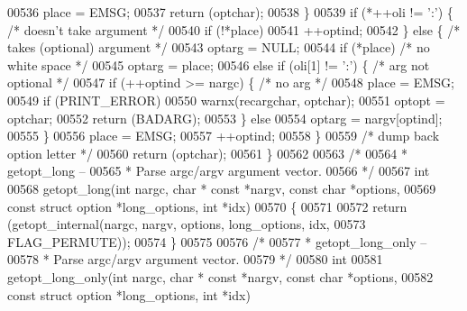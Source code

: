 \begin{DoxyCode}
{{{{{{{00536         place = EMSG;
00537         \textcolor{keywordflow}{return} (optchar);
00538     \}
00539     \textcolor{keywordflow}{if} (*++oli != \textcolor{charliteral}{':'}) \{            \textcolor{comment}{/* doesn't take argument */}
00540         \textcolor{keywordflow}{if} (!*place)
00541             ++optind;
00542     \} \textcolor{keywordflow}{else} \{                \textcolor{comment}{/* takes (optional) argument */}
00543         optarg = NULL;
00544         \textcolor{keywordflow}{if} (*place)         \textcolor{comment}{/* no white space */}
00545             optarg = place;
00546         \textcolor{keywordflow}{else} \textcolor{keywordflow}{if} (oli[1] != \textcolor{charliteral}{':'}) \{   \textcolor{comment}{/* arg not optional */}
00547             \textcolor{keywordflow}{if} (++optind >= nargc) \{    \textcolor{comment}{/* no arg */}
00548                 place = EMSG;
00549                 \textcolor{keywordflow}{if} (PRINT_ERROR)
00550                     warnx(recargchar, optchar);
00551                 optopt = optchar;
00552                 \textcolor{keywordflow}{return} (BADARG);
00553             \} \textcolor{keywordflow}{else}
00554                 optarg = nargv[optind];
00555         \}
00556         place = EMSG;
00557         ++optind;
00558     \}
00559     \textcolor{comment}{/* dump back option letter */}
00560     \textcolor{keywordflow}{return} (optchar);
00561 \}
00562 
00563 \textcolor{comment}{/*}
00564 \textcolor{comment}{ * getopt\_long --}
00565 \textcolor{comment}{ *  Parse argc/argv argument vector.}
00566 \textcolor{comment}{ */}
00567 \textcolor{keywordtype}{int}
00568 getopt_long(\textcolor{keywordtype}{int} nargc, \textcolor{keywordtype}{char} * \textcolor{keyword}{const} *nargv, \textcolor{keyword}{const} \textcolor{keywordtype}{char} *options,
00569     \textcolor{keyword}{const} \textcolor{keyword}{struct} option *long\_options, \textcolor{keywordtype}{int} *idx)
00570 \{
00571 
00572     \textcolor{keywordflow}{return} (getopt_internal(nargc, nargv, options, long\_options, idx,
00573         FLAG_PERMUTE));
00574 \}
00575 
00576 \textcolor{comment}{/*}
00577 \textcolor{comment}{ * getopt\_long\_only --}
00578 \textcolor{comment}{ *  Parse argc/argv argument vector.}
00579 \textcolor{comment}{ */}
00580 \textcolor{keywordtype}{int}
00581 getopt_long_only(\textcolor{keywordtype}{int} nargc, \textcolor{keywordtype}{char} * \textcolor{keyword}{const} *nargv, \textcolor{keyword}{const} \textcolor{keywordtype}{char} *options,
00582     \textcolor{keyword}{const} \textcolor{keyword}{struct} option *long\_options, \textcolor{keywordtype}{int} *idx)
}}}}}}}
\end{DoxyCode}
